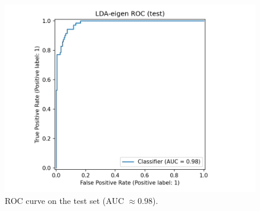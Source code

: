 \documentclass[journal]{IEEEtran}
\begin{document}
\begin{figure}[htbp]
	\centering
	\includegraphics[width=.72\linewidth]{assets/LDA-eigen_roc_test.png}
	\caption{ROC curve on the test set (AUC $\approx 0.98$).}
	\label{fig:lda-roc}
\end{figure}
\end{document}
